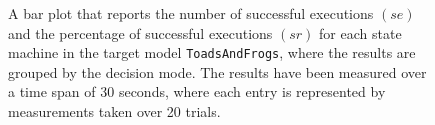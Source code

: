 \begin{figure}[h!]
\centering
\begin{minipage}{1\textwidth}
  \centering
  \makebox[\textwidth][c]{ %
        \resizebox{1.19\textwidth}{!}{ %
            
        }%
    }%
\end{minipage}
\caption{A bar plot that reports the number of successful executions $(se)$ and the percentage of successful executions $(sr)$ for each state machine in the target model \texttt{ToadsAndFrogs}, where the results are grouped by the decision mode. The results have been measured over a time span of 30 seconds, where each entry is represented by measurements taken over 20 trials.}
\label{figure:decision_mode_state_machine_transition_frequency_comparison_toadsandfrogs}
\end{figure}